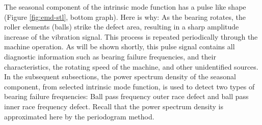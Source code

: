 \documentclass[../Main/thesis.tex]{subfiles}
\begin{document}
The seasonal component of the intrinsic mode function has a pulse like shape (Figure  \ref{fig:emd-stl}, bottom graph). Here is why: As the bearing rotates, the roller elements (balls) strike the defect area, resulting in a sharp amplitude increase of the vibration signal. This process is repeated periodically through the machine operation. As will be shown shortly, this pulse signal contains all diagnostic information such as bearing failure frequencies, and their characteristics, the rotating speed of the machine, and other unidentified sources.
\justify
In the subsequent subsections, the power spectrum density of the seasonal component, from selected intrinsic mode function, is used to detect two types of bearing failure frequencies: Ball pass frequency outer race defect and ball pass inner race frequency defect. Recall that the power spectrum density is approximated here by the periodogram method.
\end{document}
